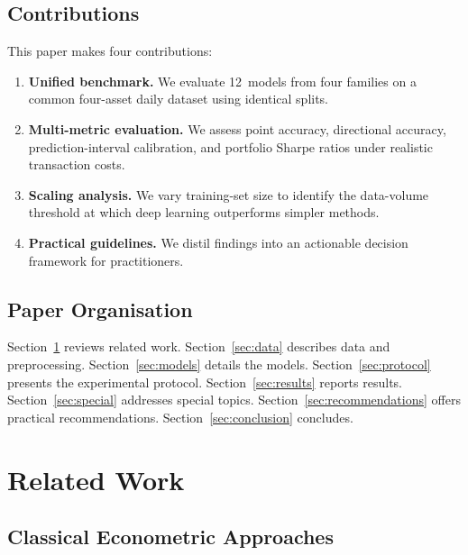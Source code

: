 \documentclass[11pt,a4paper,twocolumn]{article}
\begin{document}
\subsection{Contributions}

This paper makes four contributions:

\begin{enumerate}[leftmargin=*,itemsep=2pt]
    \item \textbf{Unified benchmark.} We evaluate 12~models from four families
          on a common four-asset daily dataset using identical splits.
    \item \textbf{Multi-metric evaluation.} We assess point accuracy, directional
          accuracy, prediction-interval calibration, and portfolio Sharpe ratios
          under realistic transaction costs.
    \item \textbf{Scaling analysis.} We vary training-set size to identify the
          data-volume threshold at which deep learning outperforms simpler methods.
    \item \textbf{Practical guidelines.} We distil findings into an actionable
          decision framework for practitioners.
\end{enumerate}

\subsection{Paper Organisation}

Section~\ref{sec:related} reviews related work.  Section~\ref{sec:data}
describes data and preprocessing.  Section~\ref{sec:models} details the models.
Section~\ref{sec:protocol} presents the experimental protocol.
Section~\ref{sec:results} reports results.  Section~\ref{sec:special} addresses
special topics.  Section~\ref{sec:recommendations} offers practical
recommendations.  Section~\ref{sec:conclusion} concludes.


\section{Related Work}\label{sec:related}

\subsection{Classical Econometric Approaches}
\end{document}
